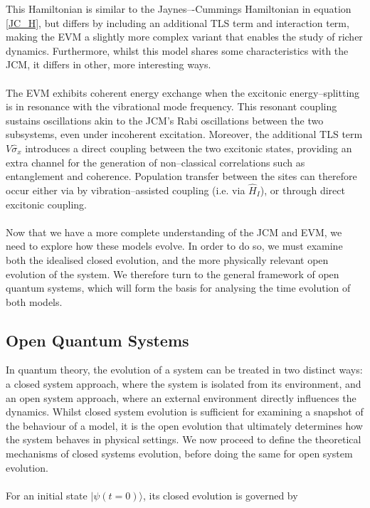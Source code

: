 \documentclass[11pt]{article}
\begin{document}
This Hamiltonian is similar to the Jaynes–-Cummings Hamiltonian in equation \eqref{JC_H}, but differs by including an additional TLS term and interaction term, making the EVM a slightly more complex variant that enables the study of richer dynamics. Furthermore, whilst this model shares some characteristics with the JCM, it differs in other, more interesting ways. \\
\\
The EVM exhibits coherent energy exchange when the excitonic energy--splitting is in resonance with the vibrational mode frequency. This resonant coupling sustains oscillations akin to the JCM's Rabi oscillations between the two subsystems, even under incoherent excitation. Moreover, the additional TLS term $V\hat{\sigma}_x$ introduces a direct coupling between the two excitonic states, providing an extra channel for the generation of non--classical correlations such as entanglement and coherence. Population transfer between the sites can therefore occur either via by vibration--assisted coupling (i.e. via $\hat{H}_I$), or through direct excitonic coupling.\\
\\
Now that we have a more complete understanding of the JCM and EVM, we need to explore how these models evolve. In order to do so, we must examine both the idealised closed evolution, and the more physically relevant open evolution of the system. We therefore turn to the general framework of open quantum systems, which will form the basis for analysing the time evolution of both models.

\newpage
\subsection{Open Quantum Systems} \label{sec:theory_sub_OQS}

In quantum theory, the evolution of a system can be treated in two distinct ways: a closed system approach, where the system is isolated from its environment, and an open system approach, where an external environment directly influences the dynamics. Whilst closed system evolution is sufficient for examining a snapshot of the behaviour of a model, it is the open evolution that ultimately determines how the system behaves in physical settings. We now proceed to define the theoretical mechanisms of closed systems evolution, before doing the same for open system evolution.\\
\\
For an initial state $|\psi (t=0)\rangle$, its closed evolution is governed by
\end{document}

